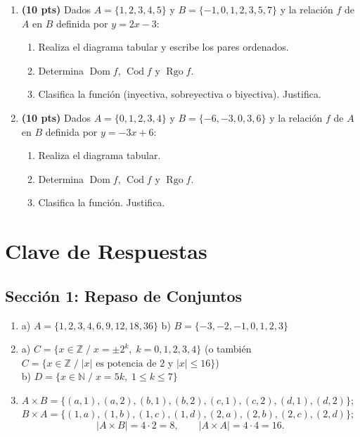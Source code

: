 \documentclass[12pt, letterpaper]{article}
\newcommand{\N}{\mathbb{N}}
\newcommand{\Z}{\mathbb{Z}}
\newcommand{\Dom}{\operatorname{Dom}}
\newcommand{\Cod}{\operatorname{Cod}}
\newcommand{\Rgo}{\operatorname{Rgo}}
\begin{document}
\begin{enumerate}[leftmargin=*]
  \item \textbf{(10 pts)} Dados $A = \{1, 2, 3, 4, 5\}$ y $B = \{-1, 0, 1, 2, 3, 5, 7\}$ y la relación $f$ de $A$ en $B$ definida por $y = 2x - 3$:
        \begin{enumerate}[label=\alph*)]
          \item Realiza el diagrama tabular y escribe los pares ordenados.
          \item Determina $\Dom f$, $\Cod f$ y $\Rgo f$.
          \item Clasifica la función (inyectiva, sobreyectiva o biyectiva). Justifica.
        \end{enumerate}

  \item \textbf{(10 pts)} Dados $A = \{0, 1, 2, 3, 4\}$ y $B = \{-6, -3, 0, 3, 6\}$ y la relación $f$ de $A$ en $B$ definida por $y = -3x + 6$:
        \begin{enumerate}[label=\alph*)]
          \item Realiza el diagrama tabular.
          \item Determina $\Dom f$, $\Cod f$ y $\Rgo f$.
          \item Clasifica la función. Justifica.
        \end{enumerate}
\end{enumerate}

\newpage

\ifmwclaves
  \section{Clave de Respuestas}

  \subsection*{Sección 1: Repaso de Conjuntos}

  \begin{enumerate}[leftmargin=*, label=\textbf{\arabic*.}]
    \item a) $A = \{1, 2, 3, 4, 6, 9, 12, 18, 36\}$ \quad b) $B = \{-3, -2, -1, 0, 1, 2, 3\}$

    \item a) $C = \{x \in \Z \;/\; x = \pm 2^k, \; k = 0, 1, 2, 3, 4\}$ \quad (o también $C = \{x \in \Z \;/\; |x| \text{ es potencia de } 2 \text{ y } |x| \leq 16\}$)
          \\[2pt]
          b) $D = \{x \in \N \;/\; x = 5k, \; 1 \leq k \leq 7\}$

    \item $A \times B = \{(a,1), (a,2), (b,1), (b,2), (c,1), (c,2), (d,1), (d,2)\}$; \quad
          $B \times A = \{(1,a), (1,b), (1,c), (1,d), (2,a), (2,b), (2,c), (2,d)\}$;
          $$|A \times B| = 4 \cdot 2 = 8, \qquad |A \times A| = 4 \cdot 4 = 16.$$
  \end{enumerate}
\end{document}

